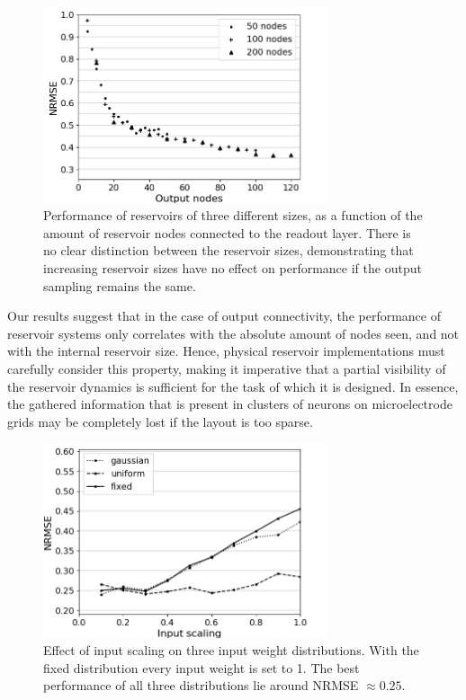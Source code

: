\begin{figure}[t!]
  \centering
  \includegraphics[width=3.3in]{img/output_nodes.png}
  \caption{
    Performance of reservoirs of three different sizes, as a function of the
amount of reservoir nodes connected to the readout layer. There is no clear
distinction between the reservoir sizes, demonstrating that increasing reservoir
sizes have no effect on performance if the output sampling remains the same.
  }
  \label{output_nodes}
\end{figure}

Our results suggest that in the case of output connectivity, the performance of
reservoir systems only correlates with the absolute amount of nodes seen, and
not with the internal reservoir size. Hence, physical reservoir implementations
must carefully consider this property, making it imperative that a partial
visibility of the reservoir dynamics is sufficient for the task of which it is
designed. In essence, the gathered information that is present in clusters of
neurons on microelectrode grids may be completely lost if the layout is too
sparse.


\begin{figure}[t!]
  \centering
  \includegraphics[width=3.3in]{img/input_scaling_distrib.png}
  \caption{
    Effect of input scaling on three input weight distributions. With the fixed
distribution every input weight is set to 1. The best performance of all three
distributions lie around NRMSE $\approx 0.25$.
  }
  \label{input_scaling_distrib}
\end{figure}

